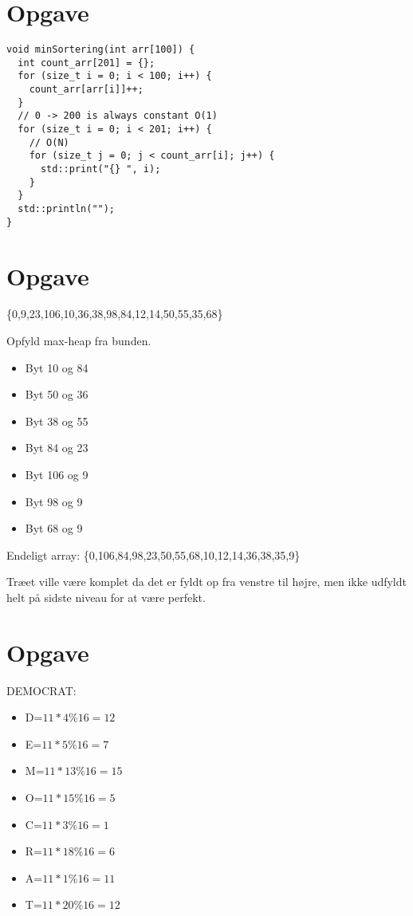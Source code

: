 \documentclass{article}
\begin{document}
\section{Opgave} %
\begin{verbatim}
void minSortering(int arr[100]) {
  int count_arr[201] = {};
  for (size_t i = 0; i < 100; i++) {
    count_arr[arr[i]]++;
  }
  // 0 -> 200 is always constant O(1)
  for (size_t i = 0; i < 201; i++) {
    // O(N)
    for (size_t j = 0; j < count_arr[i]; j++) {
      std::print("{} ", i);
    }
  }
  std::println("");
}
\end{verbatim}
\section{Opgave} %
\{0,9,23,106,10,36,38,98,84,12,14,50,55,35,68\}

Opfyld max-heap fra bunden. 
\begin{itemize}
  \item Byt 10 og 84
  \item Byt 50 og 36
  \item Byt 38 og 55
  \item Byt 84 og 23
  \item Byt 106 og 9
  \item Byt 98 og 9
  \item Byt 68 og 9
\end{itemize}

Endeligt array:
\{0,106,84,98,23,50,55,68,10,12,14,36,38,35,9\}

Træet ville være komplet da det er fyldt op fra venstre til højre,
men ikke udfyldt helt på sidste niveau for at være perfekt.

\section{Opgave} %
DEMOCRAT:
\begin{itemize}
  \item D=\( 11*4\%16=12 \)
  \item E=\( 11*5\%16=7 \)
  \item M=\( 11*13\%16=15 \)
  \item O=\( 11*15\%16=5 \)
  \item C=\( 11*3\%16=1 \)
  \item R=\( 11*18\%16=6 \)
  \item A=\( 11*1\%16=11 \)
  \item T=\( 11*20\%16=12 \)
\end{itemize}
\end{document}
